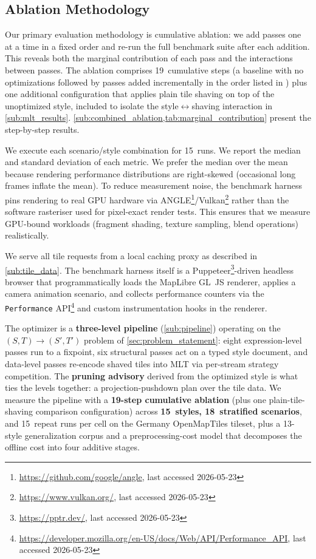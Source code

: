 {\subsection{Ablation Methodology}\label{sub:ablation}

Our primary evaluation methodology is cumulative ablation: we add passes one at a time in a fixed order and re-run the full benchmark suite after each addition.
This reveals both the marginal contribution of each pass and the interactions between passes.
The ablation comprises 19~cumulative steps (a baseline with no optimizations followed by passes added incrementally in the order listed in ) plus one additional configuration that applies plain tile shaving on top of the unoptimized style, included to isolate the style$\leftrightarrow$shaving interaction in \cref{sub:mlt_results}.
\cref{sub:combined_ablation,tab:marginal_contribution} present the step-by-step results.

We execute each scenario/style combination for 15~runs.
We report the median and standard deviation of each metric.
We prefer the median over the mean because rendering performance distributions are right-skewed (occasional long frames inflate the mean).
To reduce measurement noise, the benchmark harness pins rendering to real \ac{GPU} hardware via ANGLE\footnote{\url{https://github.com/google/angle}, last accessed 2026-05-23}/Vulkan\footnote{\url{https://www.vulkan.org/}, last accessed 2026-05-23} rather than the software rasteriser used for pixel-exact render tests.
This ensures that we measure \ac{GPU}-bound workloads (fragment shading, texture sampling, blend operations) realistically.

We serve all tile requests from a local caching proxy as described in \cref{sub:tile_data}.
The benchmark harness itself is a Puppeteer\footnote{\url{https://pptr.dev/}, last accessed 2026-05-23}-driven headless browser that programmatically loads the MapLibre GL~JS renderer, applies a camera animation scenario, and collects performance counters via the \texttt{Performance} \ac{API}\footnote{\url{https://developer.mozilla.org/en-US/docs/Web/API/Performance_API}, last accessed 2026-05-23} and custom instrumentation hooks in the renderer.

\begin{chaptersummary}
The optimizer is a \textbf{three-level pipeline} (\cref{sub:pipeline}) operating on the $(S, T) \to (S', T')$ problem of \cref{sec:problem_statement}: eight expression-level passes run to a fixpoint, six structural passes act on a typed style document, and data-level passes re-encode shaved tiles into \ac{MLT} via per-stream strategy competition.
The \textbf{pruning advisory} derived from the optimized style is what ties the levels together: a projection-pushdown plan over the tile data.
We measure the pipeline with a \textbf{19-step cumulative ablation} (plus one plain-tile-shaving comparison configuration) across \textbf{15~styles, 18~stratified scenarios}, and 15~repeat runs per cell on the Germany OpenMapTiles tileset, plus a 13-style generalization corpus and a preprocessing-cost model that decomposes the offline cost into four additive stages.


\end{chaptersummary}}
